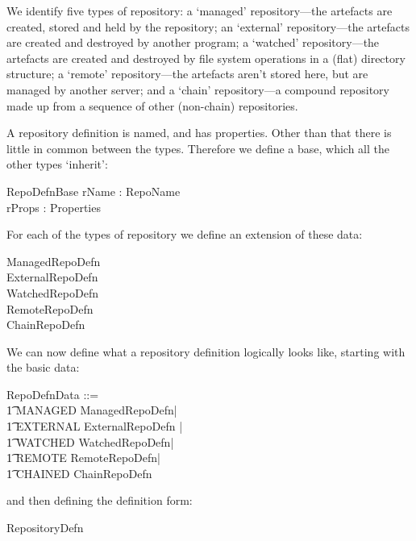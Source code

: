 \documentclass[a4paper,titlepage,twoside,12pt]{article}
\begin{document}
We identify five types of repository: a `managed' repository---the artefacts are created, stored and held by the repository; an `external' re\-posi\-tory---the artefacts are created and destroyed by another program; a `watched' repository---the artefacts are created and destroyed by file system operations in a (flat) directory structure; a `remote' repository---the artefacts aren't stored here, but are managed by another server; and a `chain' repository---a compound repository made up from a sequence of other (non-chain) repositories.

A repository definition is named, and has properties. Other than that there is little in common between the types. Therefore we define a base, which all the other types `inherit':
\begin{schema}{RepoDefnBase}
	rName : RepoName	\\
	rProps : Properties
\end{schema}

For each of the types of repository we define an extension of these data:
\begin{zed}
ManagedRepoDefn 	\\
ExternalRepoDefn 	\\
WatchedRepoDefn 	\\
RemoteRepoDefn 	\\
ChainRepoDefn 
\end{zed}

We can now define what a repository definition logically looks like, starting with the basic data:
\begin{zed}
	RepoDefnData ::= \\
	\t1 MANAGED \ldata ManagedRepoDefn\rdata | \\
	\t1 EXTERNAL \ldata  ExternalRepoDefn \rdata | \\
	\t1 WATCHED \ldata WatchedRepoDefn\rdata| \\
	\t1 REMOTE \ldata RemoteRepoDefn\rdata | \\
	\t1 CHAINED \ldata ChainRepoDefn \rdata
\end{zed}
and then defining the definition form:
\begin{zed}
	RepositoryDefn 
\end{zed}
\end{document}
